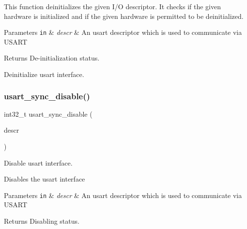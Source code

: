 This function deinitializes the given I/O descriptor. It checks if the given hardware is initialized and if the given hardware is permitted to be deinitialized.


\begin{DoxyParams}[1]{Parameters}
\mbox{\tt in}  & {\em descr} & An usart descriptor which is used to communicate via U\+S\+A\+RT\\
\hline
\end{DoxyParams}
\begin{DoxyReturn}{Returns}
De-\/initialization status.
\end{DoxyReturn}
Deinitialize usart interface. \mbox{\label{group__doc__driver__hal__usart__sync_ga76abe691b76e4b95b4e3a7d5bc79b026}} 
\subsubsection{\texorpdfstring{usart\+\_\+sync\+\_\+disable()}{usart\_sync\_disable()}}
{\footnotesize\ttfamily int32\+\_\+t usart\+\_\+sync\+\_\+disable (\begin{DoxyParamCaption}\item[{struct \hyperlink{structusart__sync__descriptor}{usart\+\_\+sync\+\_\+descriptor} $\ast$const}]{descr }\end{DoxyParamCaption})}



Disable usart interface. 

Disables the usart interface


\begin{DoxyParams}[1]{Parameters}
\mbox{\tt in}  & {\em descr} & An usart descriptor which is used to communicate via U\+S\+A\+RT\\
\hline
\end{DoxyParams}
\begin{DoxyReturn}{Returns}
Disabling status. 
\end{DoxyReturn}
\mbox{\label{group__doc__driver__hal__usart__sync_ga351aa9c8c94b4e8b0eb5efb1ecd74a82}} 
